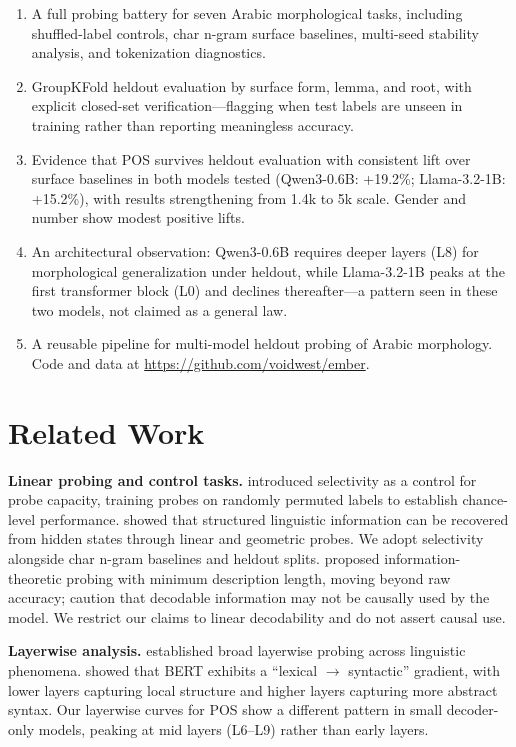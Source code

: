 \documentclass[11pt,a4paper]{article}
\begin{document}
\begin{enumerate}
\item A full probing battery for seven Arabic morphological tasks, including shuffled-label controls, char n-gram surface baselines, multi-seed stability analysis, and tokenization diagnostics.
\item GroupKFold heldout evaluation by surface form, lemma, and root, with explicit closed-set verification---flagging when test labels are unseen in training rather than reporting meaningless accuracy.
\item Evidence that POS survives heldout evaluation with consistent lift over surface baselines in both models tested (Qwen3-0.6B: +19.2\%; Llama-3.2-1B: +15.2\%), with results strengthening from 1.4k to 5k scale. Gender and number show modest positive lifts.
\item An architectural observation: Qwen3-0.6B requires deeper layers (L8) for morphological generalization under heldout, while Llama-3.2-1B peaks at the first transformer block (L0) and declines thereafter---a pattern seen in these two models, not claimed as a general law.
\item A reusable pipeline for multi-model heldout probing of Arabic morphology. Code and data at \url{https://github.com/voidwest/ember}.
\end{enumerate}

\section{Related Work}

\textbf{Linear probing and control tasks.} \citet{hewitt-liang-2019} introduced selectivity as a control for probe capacity, training probes on randomly permuted labels to establish chance-level performance. \citet{hewitt-manning-2019} showed that structured linguistic information can be recovered from hidden states through linear and geometric probes. We adopt selectivity alongside char n-gram baselines and heldout splits. \citet{voita-etal-2020} proposed information-theoretic probing with minimum description length, moving beyond raw accuracy; \citet{ravichander-etal-2021} caution that decodable information may not be causally used by the model. We restrict our claims to linear decodability and do not assert causal use.

\textbf{Layerwise analysis.} \citet{tenney-etal-2019-iclr} established broad layerwise probing across linguistic phenomena. \citet{tenney-das-pavlick-2019} showed that BERT exhibits a ``lexical $\rightarrow$ syntactic'' gradient, with lower layers capturing local structure and higher layers capturing more abstract syntax. Our layerwise curves for POS show a different pattern in small decoder-only models, peaking at mid layers (L6--L9) rather than early layers.
\end{document}
